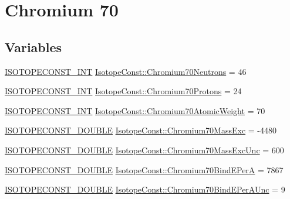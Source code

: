 \hypertarget{group___isotope_const-_chromium-_cr70}{}\section{Chromium 70}
\label{group___isotope_const-_chromium-_cr70}
\subsection*{Variables}
\begin{DoxyCompactItemize}
\item 
\mbox{\hyperlink{group___isotope_const-_macros_ga5f18360b3e99483a35c32d789e62621c}{I\+S\+O\+T\+O\+P\+E\+C\+O\+N\+S\+T\+\_\+\+I\+NT}} \mbox{\hyperlink{group___isotope_const-_chromium-_cr70_gaf515623e700ea946aef79d0fb7286589}{Isotope\+Const\+::\+Chromium70\+Neutrons}} = 46
\item 
\mbox{\hyperlink{group___isotope_const-_macros_ga5f18360b3e99483a35c32d789e62621c}{I\+S\+O\+T\+O\+P\+E\+C\+O\+N\+S\+T\+\_\+\+I\+NT}} \mbox{\hyperlink{group___isotope_const-_chromium-_cr70_gadc8088221a9552f5a868a22ef8b44374}{Isotope\+Const\+::\+Chromium70\+Protons}} = 24
\item 
\mbox{\hyperlink{group___isotope_const-_macros_ga5f18360b3e99483a35c32d789e62621c}{I\+S\+O\+T\+O\+P\+E\+C\+O\+N\+S\+T\+\_\+\+I\+NT}} \mbox{\hyperlink{group___isotope_const-_chromium-_cr70_gaaae42fd0c0dc1a558370cb8ee9773f25}{Isotope\+Const\+::\+Chromium70\+Atomic\+Weight}} = 70
\item 
\mbox{\hyperlink{group___isotope_const-_macros_ga8f45a7272ce02c0b4c65c44636ed719a}{I\+S\+O\+T\+O\+P\+E\+C\+O\+N\+S\+T\+\_\+\+D\+O\+U\+B\+LE}} \mbox{\hyperlink{group___isotope_const-_chromium-_cr70_ga708bf3952078b215183b7068bc74eb3a}{Isotope\+Const\+::\+Chromium70\+Mass\+Exc}} = -\/4480
\item 
\mbox{\hyperlink{group___isotope_const-_macros_ga8f45a7272ce02c0b4c65c44636ed719a}{I\+S\+O\+T\+O\+P\+E\+C\+O\+N\+S\+T\+\_\+\+D\+O\+U\+B\+LE}} \mbox{\hyperlink{group___isotope_const-_chromium-_cr70_gabd7214e9854198fb5e7c7bf234d5f0f6}{Isotope\+Const\+::\+Chromium70\+Mass\+Exc\+Unc}} = 600
\item 
\mbox{\hyperlink{group___isotope_const-_macros_ga8f45a7272ce02c0b4c65c44636ed719a}{I\+S\+O\+T\+O\+P\+E\+C\+O\+N\+S\+T\+\_\+\+D\+O\+U\+B\+LE}} \mbox{\hyperlink{group___isotope_const-_chromium-_cr70_ga5877519b1a878ad6e082f156fb2a2d31}{Isotope\+Const\+::\+Chromium70\+Bind\+E\+PerA}} = 7867
\item 
\mbox{\hyperlink{group___isotope_const-_macros_ga8f45a7272ce02c0b4c65c44636ed719a}{I\+S\+O\+T\+O\+P\+E\+C\+O\+N\+S\+T\+\_\+\+D\+O\+U\+B\+LE}} \mbox{\hyperlink{group___isotope_const-_chromium-_cr70_gaaa949adaf952b9fe05fc16b148aacca0}{Isotope\+Const\+::\+Chromium70\+Bind\+E\+Per\+A\+Unc}} = 9

\end{DoxyCompactItemize}
